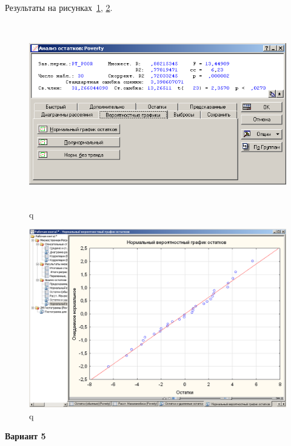 Результаты на рисунках~\ref{fig:example_35}, \ref{fig:example_36}.

\begin{figure}[!h]
  \centering

  \includegraphics[height=8cm]
  {inc/example_35.PNG}

  \caption{q}

  \label{fig:example_35}
\end{figure}

\begin{figure}[!h]
  \centering

  \includegraphics[width=16cm]
  {inc/example_36.PNG}

  \caption{q}

  \label{fig:example_36}
\end{figure}

\newpage

\begin{center}
  \textbf{Вариант 5}
\end{center}


